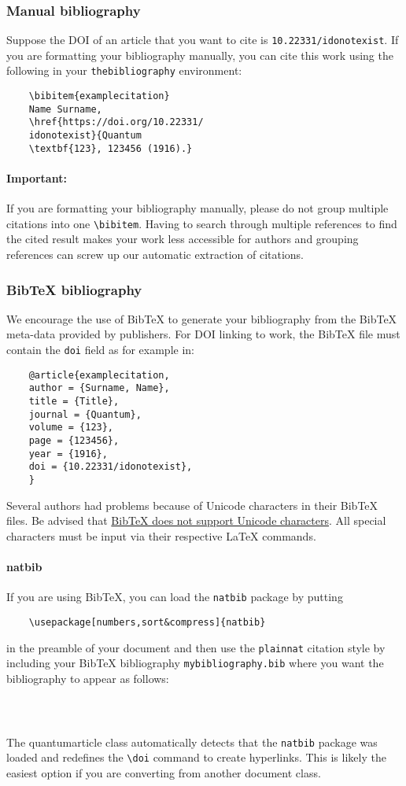 \documentclass[a4paper,noarxiv,onecolumn]{quantumarticle}
\begin{document}
	\subsubsection{Manual bibliography}
	Suppose the DOI of an article that you want to cite is \texttt{10.22331/idonotexist}. If you are formatting your bibliography manually, you can cite this work using the following in your \texttt{thebibliography} environment:
	\begin{verbatim}
	\bibitem{examplecitation}
	Name Surname,
	\href{https://doi.org/10.22331/
	idonotexist}{Quantum
	\textbf{123}, 123456 (1916).}
	\end{verbatim}
	
	\paragraph{Important:} If you are formatting your bibliography manually, please do not group multiple citations into one \texttt{\textbackslash{}bibitem}.
	Having to search through multiple references to find the cited result makes your work less accessible for authors and grouping references can screw up our automatic extraction of citations.
	
	\subsubsection{BibTeX bibliography}
	We encourage the use of BibTeX to generate your bibliography from the BibTeX meta-data provided by publishers.
	For DOI linking to work, the BibTeX file must contain the \texttt{doi} field as for example in:
	\begin{verbatim}
	@article{examplecitation,
	author = {Surname, Name},
	title = {Title},
	journal = {Quantum},
	volume = {123},
	page = {123456},
	year = {1916},
	doi = {10.22331/idonotexist},
	}
	\end{verbatim}
	Several authors had problems because of Unicode characters in their BibTeX files.
	Be advised that \href{http://wiki.lyx.org/BibTeX/Tips}{BibTeX does not support Unicode characters}.
	All special characters must be input via their respective LaTeX commands.
	
	\paragraph{natbib}
	If you are using BibTeX, you can load the \texttt{natbib} package by putting
	\begin{verbatim}
	\usepackage[numbers,sort&compress]{natbib}
	\end{verbatim}
	in the preamble of your document and then use the \texttt{plainnat} citation style by including your BibTeX bibliography \texttt{mybibliography.bib} where you want the bibliography to appear as follows:
	\begin{verbatim}
	
	
	\end{verbatim}
	The quantumarticle class automatically detects that the \texttt{natbib} package was loaded and redefines the \texttt{\textbackslash{}doi} command to create hyperlinks.
	This is likely the easiest option if you are converting from another document class.
	
\end{document}

